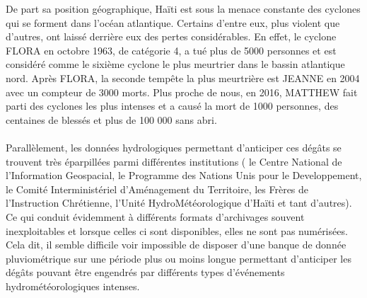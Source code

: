  De part sa position géographique, Haïti est sous la menace constante des cyclones qui se forment dans l'océan atlantique. Certains d'entre eux, plus violent que d'autres, ont laiss\'e derrière eux des pertes considérables. %
En effet, le cyclone FLORA en octobre 1963, de catégorie 4, a tué plus de 5000 personnes et est considéré comme le sixième cyclone le plus meurtrier dans le bassin atlantique nord. Après FLORA, la seconde  tempête la plus meurtrière est JEANNE en 2004  avec un compteur de 3000 morts. Plus proche de  nous, en 2016, MATTHEW fait parti des cyclones les plus intenses et a caus\'e la mort de 1000 personnes,  des centaines de blessés et plus de 100 000 sans abri.\\ \ \\
Parallèlement,  les données hydrologiques permettant d’anticiper ces dégâts se trouvent très éparpillées parmi différentes institutions ( le Centre National de l'Information Geospacial, le Programme des Nations Unis pour le Developpement, le Comité Interministériel d’Aménagement du Territoire, les Frères de l’Instruction Chrétienne, l'Unité HydroMétéorologique d'Haïti et tant d'autres). Ce qui conduit évidemment \`a différents formats d’archivages souvent inexploitables et lorsque celles ci sont disponibles, elles ne sont pas numérisées. Cela dit, il semble difficile voir impossible de disposer d'une banque de donnée pluviométrique sur une période plus ou moins longue permettant d’anticiper les dégâts pouvant être engendrés par différents types d’événements hydrométéorologiques intenses.\\
 
